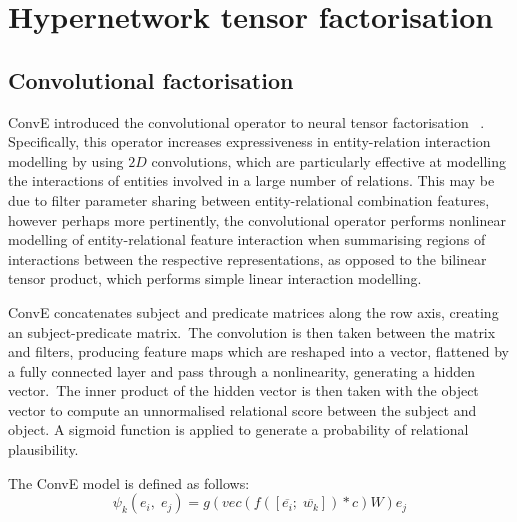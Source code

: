 
\section{Hypernetwork tensor factorisation}

\subsection{Convolutional factorisation}

ConvE introduced the convolutional operator to neural tensor factorisation \unskip ~\citep{dettmers2018convolutional}. Specifically, this operator increases expressiveness in entity-relation interaction modelling by using $ 2D $ convolutions, which are particularly effective at modelling the interactions of entities involved in a large number of relations. This may be due to filter parameter sharing between entity-relational combination features, however perhaps more pertinently, the convolutional operator performs nonlinear modelling of entity-relational feature interaction when summarising regions of interactions between the respective representations, as opposed to the bilinear tensor product, which performs simple linear interaction modelling. \par

\noindent ConvE concatenates subject and predicate matrices along the row axis, creating an subject-predicate matrix.\ The convolution is then taken between the matrix and filters, producing feature maps which are reshaped into a vector, flattened by a fully connected layer and pass through a nonlinearity, generating a hidden vector.\ The inner product of the hidden vector is then taken with the object vector to compute an unnormalised relational score between the subject and object. A sigmoid function is applied to generate a probability of relational plausibility. 

\noindent The ConvE model is defined as follows:
\begin{equation}
	\psi_k(e_i, \; e_j) = g(vec(f(\left [ \overline{e_i}; \; \overline{w_k} \right ]) * c)W )e_j
\end{equation}

